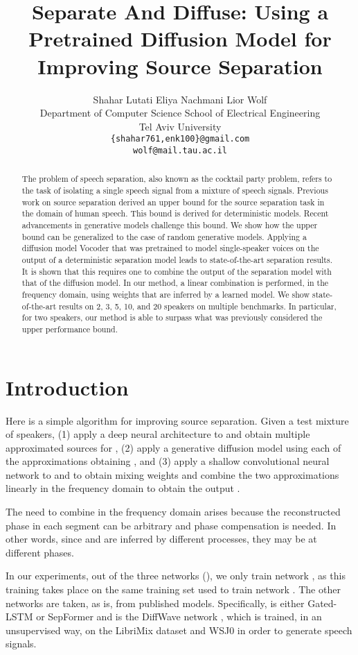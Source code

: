 \documentclass{article}
\title{Separate And Diffuse: Using a Pretrained Diffusion Model for Improving Source Separation}
\author{Shahar Lutati \quad Eliya Nachmani \quad Lior Wolf\\
Department of Computer Science \quad School of Electrical Engineering\\ Tel Aviv University\\
\texttt{\{shahar761,enk100\}@gmail.com}\\
\texttt{wolf@mail.tau.ac.il}
}
\theoremstyle{plain}
\theoremstyle{definition}
\theoremstyle{remark}
\begin{document}
\maketitle

\begin{abstract}
The problem of speech separation, also known as the cocktail party problem, refers to the task of isolating a single speech signal from a mixture of speech signals.
Previous work on source separation derived an upper bound for the source separation task in the domain of human speech. This bound is derived for deterministic models. Recent advancements in generative models challenge this bound. We show how the upper bound can be generalized to the case of random generative models.
Applying a diffusion model Vocoder that was pretrained to model single-speaker voices on the output of a deterministic separation model leads to state-of-the-art separation results. It is shown that this requires one to combine the output of the separation model with that of the diffusion model. In our method, a linear combination is performed, in the frequency domain, using weights that are inferred by a learned model. We show state-of-the-art results on 2, 3, 5, 10, and 20 speakers on multiple benchmarks. In particular, for two speakers, our method is able to surpass what was previously considered the upper performance bound.
\end{abstract}


\section{Introduction}
\label{sec:introduction}

Here is a simple algorithm for improving source separation. Given a test mixture  of  speakers, (1) apply a deep neural architecture  to  and obtain multiple approximated sources  for , (2) apply a generative diffusion model  using each of the approximations obtaining , and (3) apply a shallow convolutional neural network  to  and  to obtain mixing weights  and combine the two approximations linearly in the frequency domain to obtain the output .

The need to combine in the frequency domain arises because the reconstructed phase in each segment can be arbitrary and phase compensation is needed. In other words, since  and  are inferred by different processes, they may be at different phases. 

In our experiments, out of the three networks (), we only train network , as this training takes place on the same training set used to train network . The other networks are taken, as is, from published models. Specifically,  is either Gated-LSTM \cite{pmlr-v119-nachmani20a} or SepFormer \cite{subakan2021attention} and  is the DiffWave network \cite{kong2020diffwave}, which is trained, in an unsupervised way, on the LibriMix dataset \cite{panayotov2015librispeech} and WSJ0 \cite{wsj0} in order to generate speech signals. 
\end{document}

